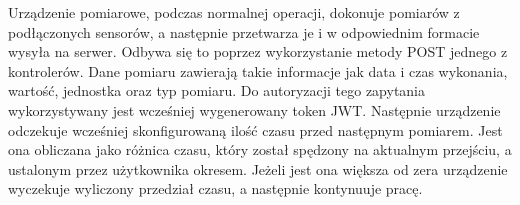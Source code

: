 Urządzenie pomiarowe, podczas normalnej operacji, dokonuje pomiarów z podłączonych sensorów, 
a następnie przetwarza je i w odpowiednim formacie wysyła na serwer. Odbywa się to poprzez
wykorzystanie metody POST jednego z kontrolerów. Dane pomiaru zawierają takie informacje jak
data i czas wykonania, wartość, jednostka oraz typ pomiaru. Do autoryzacji tego zapytania
wykorzystywany jest wcześniej wygenerowany token JWT. Następnie urządzenie odczekuje wcześniej
skonfigurowaną ilość czasu przed następnym pomiarem. Jest ona obliczana jako różnica czasu, który
został spędzony na aktualnym przejściu, a ustalonym przez użytkownika okresem. Jeżeli jest ona
większa od zera urządzenie wyczekuje wyliczony przedział czasu, a następnie kontynuuje pracę.
